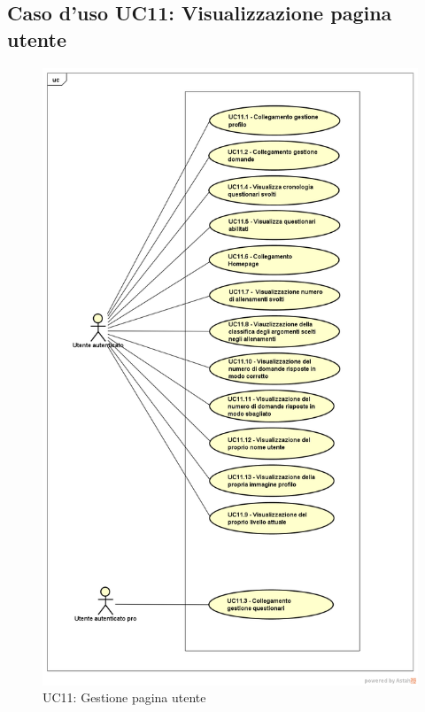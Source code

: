 \newpage
\subsection{Caso d'uso UC11: Visualizzazione pagina utente}
\label{UC11}
\begin{figure}[h]
	\centering
	\includegraphics[scale=0.40]{UML/UC11.png}
	\caption{UC11: Gestione pagina utente}
\end{figure}

